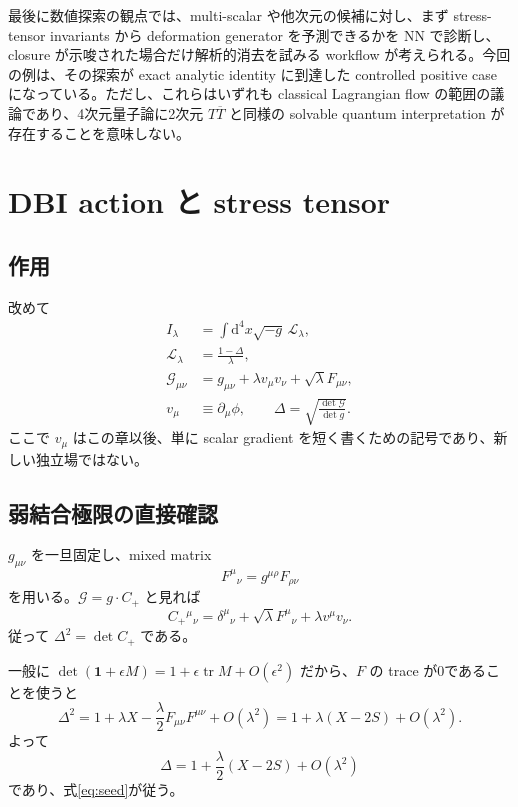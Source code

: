 \documentclass[a4paper,11pt]{ltjsreport}
\newcommand{\tr}{\operatorname{tr}}
\newcommand{\dd}{\mathrm{d}}
\newcommand{\Lag}{\mathcal L}
\newcommand{\G}{\mathcal G}
\newcommand{\Id}{\mathbf 1}
\begin{document}
最後に数値探索の観点では、multi-scalar や他次元の候補に対し、まず stress-tensor invariants から deformation generator を予測できるかを NN で診断し、closure が示唆された場合だけ解析的消去を試みる workflow が考えられる。今回の例は、その探索が exact analytic identity に到達した controlled positive case になっている。ただし、これらはいずれも classical Lagrangian flow の範囲の議論であり、4次元量子論に2次元 $T\overline T$ と同様の solvable quantum interpretation が存在することを意味しない。

\chapter{DBI action と stress tensor}

\section{作用}

改めて
\begin{align}
 I_\lambda&=\int\dd^4x\sqrt{-g}\,\Lag_\lambda,\\
 \Lag_\lambda&=\frac{1-\Delta}{\lambda},\\
 \G_{\mu\nu}&=g_{\mu\nu}+\lambda v_\mu v_\nu+\sqrt\lambda F_{\mu\nu},
 \label{eq:G-with-v}\\
 v_\mu&\equiv\partial_\mu\phi,\qquad
 \Delta=\sqrt{\frac{\det\G}{\det g}}.
\end{align}
ここで $v_\mu$ はこの章以後、単に scalar gradient を短く書くための記号であり、新しい独立場ではない。

\section{弱結合極限の直接確認}

$g_{\mu\nu}$ を一旦固定し、mixed matrix
\begin{equation}
 F^\mu{}_{\nu}=g^{\mu\rho}F_{\rho\nu}
\end{equation}
を用いる。$\G=g\cdot C_+$ と見れば
\begin{equation}
 C_+{}^\mu{}_{\nu}
 =\delta^\mu{}_{\nu}+\sqrt\lambda F^\mu{}_{\nu}+\lambda v^\mu v_\nu.
\end{equation}
従って $\Delta^2=\det C_+$ である。

一般に $\det(\Id+\epsilon M)=1+\epsilon\tr M+O(\epsilon^2)$ だから、$F$ の trace が0であることを使うと
\begin{equation}
 \Delta^2=1+\lambda X-\frac{\lambda}{2}F_{\mu\nu}F^{\mu\nu}+O(\lambda^2)
 =1+\lambda(X-2S)+O(\lambda^2).
\end{equation}
よって
\begin{equation}
 \Delta=1+\frac{\lambda}{2}(X-2S)+O(\lambda^2)
\end{equation}
であり、式\eqref{eq:seed}が従う。
\end{document}
